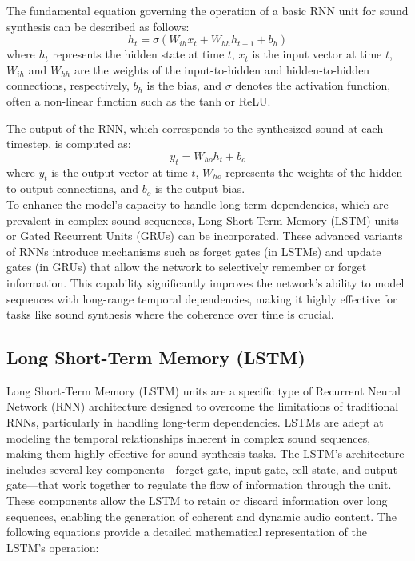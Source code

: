 \documentclass[11pt,a4paper,oneside]{report}
\begin{document}
The fundamental equation governing the operation of a basic RNN unit for sound synthesis can be described as follows:
\begin{equation}
h_t = \sigma(W_{ih} x_t + W_{hh} h_{t-1} + b_h)
\end{equation}
where $h_t$ represents the hidden state at time $t$, $x_t$ is the input vector at time $t$, $W_{ih}$ and $W_{hh}$ are the weights of the input-to-hidden and hidden-to-hidden connections, respectively, $b_h$ is the bias, and $\sigma$ denotes the activation function, often a non-linear function such as the tanh or ReLU.

The output of the RNN, which corresponds to the synthesized sound at each timestep, is computed as:
\begin{equation}
y_t = W_{ho} h_t + b_o
\end{equation}
where $y_t$ is the output vector at time $t$, $W_{ho}$ represents the weights of the hidden-to-output connections, and $b_o$ is the output bias. \\
To enhance the model's capacity to handle long-term dependencies, which are prevalent in complex sound sequences, Long Short-Term Memory (LSTM) \cite{yu2019review} units or Gated Recurrent Units (GRUs) \cite{dey2017gate} can be incorporated. 
These advanced variants of RNNs introduce mechanisms such as forget gates (in LSTMs) and update gates (in GRUs) that allow the network to selectively remember or forget information. 
This capability significantly improves the network's ability to model sequences with long-range temporal dependencies, making it highly effective for tasks like sound synthesis where the coherence over time is crucial.

\subsection{Long Short-Term Memory (LSTM)}

Long Short-Term Memory (LSTM) units are a specific type of Recurrent Neural Network (RNN) architecture designed to overcome the limitations of traditional RNNs, particularly in handling long-term dependencies. LSTMs are adept at modeling the temporal relationships inherent in complex sound sequences, making them highly effective for sound synthesis tasks. The LSTM's architecture includes several key components—forget gate, input gate, cell state, and output gate—that work together to regulate the flow of information through the unit. These components allow the LSTM to retain or discard information over long sequences, enabling the generation of coherent and dynamic audio content. The following equations provide a detailed mathematical representation of the LSTM's operation:
\end{document}
